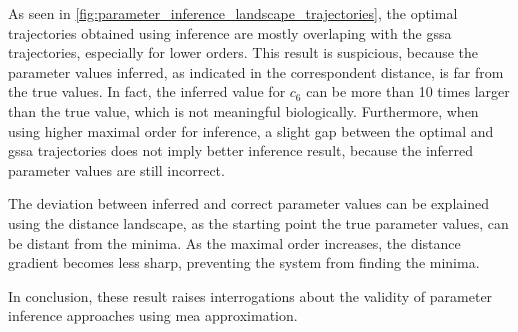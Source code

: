 As seen in \autoref{fig:parameter_inference_landscape_trajectories}, the optimal trajectories obtained using inference are mostly overlaping with the \gls{gssa} trajectories,
especially for lower orders.
This result is suspicious, because the parameter values inferred, as indicated in the correspondent distance, is far from the true values.
In fact, the inferred value for $c_6$ can be more than 10 times larger than the true value, which is not meaningful biologically.
Furthermore, when using higher maximal order for inference, a slight gap between the optimal and \gls{gssa} trajectories does not imply better inference result,
because the inferred parameter values are still incorrect.

The deviation between inferred and correct parameter values can be explained using the distance landscape,
as the starting point \ie{} the true parameter values, can be distant from the minima.
As the maximal order increases, the distance gradient becomes less sharp, preventing the system from finding the minima.

In conclusion, these result raises interrogations about the validity of parameter inference approaches using \gls{mea} approximation.
